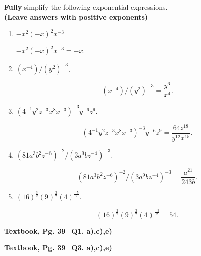 \documentclass[12pt]{article} %
\begin{document}
  \begin{qstn}
    \textbf{Fully }simplify the following exponential expressions.\\ \textbf{(Leave answers with positive exponents)}
    \begin{enumerate}[label=(\alph*)]
      \item $-x^2(-x)^2x^{-3}$
        \begin{solution}
          $-x^2(-x)^2x^{-3} = -x$.
        \end{solution}
      \item $\left( x^{-4} \right) / \left( y^{2} \right)^{-3}  $.
        \begin{solution}
          \[
            \left( x^{-4} \right) / \left( y^{2} \right)^{-3} = \frac{y^{6}}{x^4}
          .\] 
        \end{solution}
      \item $\left( 4^{-1}y^2z^{-3}x^{8}x^{-3} \right)^{-3}y^{-6}z^{9}$.
        \begin{solution}
          \[
              \left( 4^{-1}y^2z^{-3}x^{8}x^{-3} \right)^{-3}y^{-6}z^{9} =
                      \frac{64z^{18}}{y^{12}x^{15}}
          .\] 
          
        \end{solution}
      \item $\left( 81a^{3}b^{2}z^{-6} \right)^{-2}  / \left( 3a^{9}bz^{-4} \right)^{-3}$.
        \begin{solution}
          \[
          \left( 81a^{3}b^{2}z^{-6} \right)^{-2}  / \left( 3a^{9}bz^{-4} \right)^{-3} = 
                \frac{a^{21}}{243b}
          .\] 
        \end{solution}
      \item $\left( 16 \right)^{\frac{3}{2}}\left( 9 \right)^{\frac{3}{2}} \left( 4\right) ^{\frac{-5}{2}} $.
        \begin{solution}
          \[
              \left( 16 \right)^{\frac{3}{2}}\left( 9 \right)^{\frac{3}{2}} \left( 4\right) ^{\frac{-5}{2}} =
                      54
          .\] 
        \end{solution}
    \end{enumerate}
  \end{qstn}

  \newpage
    
  \begin{qstn}
    \textbf{Textbook, Pg. 39\,\,\, Q1. a),c),e)}
  \end{qstn}

  \begin{qstn}
    \textbf{Textbook, Pg. 39\,\,\, Q3. a),c),e)}
  \end{qstn}
\end{document}
